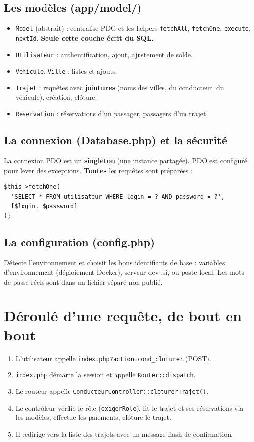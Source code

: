 \documentclass[11pt,a4paper]{article}
\begin{document}
\subsection{Les modèles (app/model/)}
\begin{itemize}[noitemsep]
  \item \texttt{Model} (abstrait) : centralise PDO et les helpers
        \texttt{fetchAll}, \texttt{fetchOne}, \texttt{execute}, \texttt{nextId}.
        \textbf{Seule cette couche écrit du SQL.}
  \item \texttt{Utilisateur} : authentification, ajout, ajustement de solde.
  \item \texttt{Vehicule}, \texttt{Ville} : listes et ajouts.
  \item \texttt{Trajet} : requêtes avec \textbf{jointures} (noms des villes, du
        conducteur, du véhicule), création, clôture.
  \item \texttt{Reservation} : réservations d'un passager, passagers d'un trajet.
\end{itemize}

\subsection{La connexion (Database.php) et la sécurité}
La connexion PDO est un \textbf{singleton} (une instance partagée). PDO est
configuré pour lever des exceptions. \textbf{Toutes} les requêtes sont préparées :
\begin{lstlisting}
$this->fetchOne(
  'SELECT * FROM utilisateur WHERE login = ? AND password = ?',
  [$login, $password]
);
\end{lstlisting}

\subsection{La configuration (config.php)}
Détecte l'environnement et choisit les bons identifiants de base : variables
d'environnement (déploiement Docker), serveur dev-isi, ou poste local. Les mots de
passe réels sont dans un fichier séparé non publié.

\section{Déroulé d'une requête, de bout en bout}
\begin{enumerate}[noitemsep]
  \item L'utilisateur appelle \texttt{index.php?action=cond\_cloturer} (POST).
  \item \texttt{index.php} démarre la session et appelle \texttt{Router::dispatch}.
  \item Le routeur appelle \texttt{ConducteurController::cloturerTrajet()}.
  \item Le contrôleur vérifie le rôle (\texttt{exigerRole}), lit le trajet et ses
        réservations via les modèles, effectue les paiements, clôture le trajet.
  \item Il redirige vers la liste des trajets avec un message flash de confirmation.
\end{enumerate}
\end{document}
